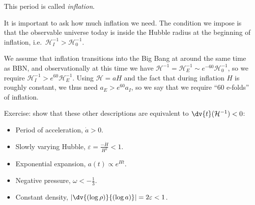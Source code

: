 \documentclass{jknotes}
\begin{document}
This period is called \emph{inflation}.

It is important to ask how much inflation we need. The condition we impose is that the observable universe today is inside the Hubble radius at the beginning of inflation, i.e.\ \(\mathcal{H}_I^{-1} > \mathcal{H}_0^{-1}\).
\begin{figure}[H]
    \centering
\end{figure}

We assume that inflation transitions into the Big Bang at around the same time as BBN, and observationally at this time we have \(\mathcal{H}^{-1}=\mathcal{H}_E^{-1}\sim e^{-60}\mathcal{H}^{-1}_0\), so we require \(\mathcal{H}_I^{-1}>e^{60}\mathcal{H}_E^{-1}\). Using \(\mathcal{H} = aH\) and the fact that during inflation \(H\) is roughly constant, we thus need \(a_E > e^{60}a_I\), so we say that we require ``60 e-folds'' of inflation.

Exercise: show that these other descriptions are equivalent to \(\dv{t}(\mathcal{H}^{-1})<0\):
\begin{itemize}
    \item Period of acceleration, \(\dot{a}>0\).
    \item Slowly varying Hubble, \(\varepsilon = \frac{-\dot{H}}{H^2} < 1\).
    \item Exponential expansion, \(a(t) \propto e^{Ht}\).
    \item Negative pressure, \(\omega < -\frac{1}{3}\).
    \item Constant density, \(\left|\dv{(\log\rho)}{(\log a)}\right| = 2\varepsilon < 1\).
\end{itemize}
\end{document}
